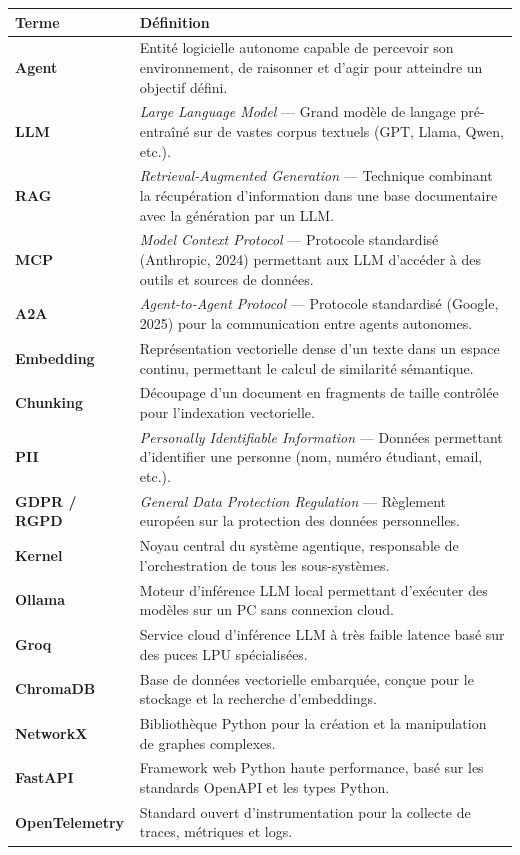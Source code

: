 \documentclass[12pt, a4paper]{article}
\begin{document}
\begin{longtable}{l p{11cm}}
\toprule
\textbf{Terme} & \textbf{Définition} \\
\midrule
\endhead
\textbf{Agent} & Entité logicielle autonome capable de percevoir son environnement, de raisonner et d'agir pour atteindre un objectif défini. \\
\addlinespace
\textbf{LLM} & \textit{Large Language Model} — Grand modèle de langage pré-entraîné sur de vastes corpus textuels (GPT, Llama, Qwen, etc.). \\
\addlinespace
\textbf{RAG} & \textit{Retrieval-Augmented Generation} — Technique combinant la récupération d'information dans une base documentaire avec la génération par un LLM. \\
\addlinespace
\textbf{MCP} & \textit{Model Context Protocol} — Protocole standardisé (Anthropic, 2024) permettant aux LLM d'accéder à des outils et sources de données. \\
\addlinespace
\textbf{A2A} & \textit{Agent-to-Agent Protocol} — Protocole standardisé (Google, 2025) pour la communication entre agents autonomes. \\
\addlinespace
\textbf{Embedding} & Représentation vectorielle dense d'un texte dans un espace continu, permettant le calcul de similarité sémantique. \\
\addlinespace
\textbf{Chunking} & Découpage d'un document en fragments de taille contrôlée pour l'indexation vectorielle. \\
\addlinespace
\textbf{PII} & \textit{Personally Identifiable Information} — Données permettant d'identifier une personne (nom, numéro étudiant, email, etc.). \\
\addlinespace
\textbf{GDPR / RGPD} & \textit{General Data Protection Regulation} — Règlement européen sur la protection des données personnelles. \\
\addlinespace
\textbf{Kernel} & Noyau central du système agentique, responsable de l'orchestration de tous les sous-systèmes. \\
\addlinespace
\textbf{Ollama} & Moteur d'inférence LLM local permettant d'exécuter des modèles sur un PC sans connexion cloud. \\
\addlinespace
\textbf{Groq} & Service cloud d'inférence LLM à très faible latence basé sur des puces LPU spécialisées. \\
\addlinespace
\textbf{ChromaDB} & Base de données vectorielle embarquée, conçue pour le stockage et la recherche d'embeddings. \\
\addlinespace
\textbf{NetworkX} & Bibliothèque Python pour la création et la manipulation de graphes complexes. \\
\addlinespace
\textbf{FastAPI} & Framework web Python haute performance, basé sur les standards OpenAPI et les types Python. \\
\addlinespace
\textbf{OpenTelemetry} & Standard ouvert d'instrumentation pour la collecte de traces, métriques et logs. \\
\bottomrule
\end{longtable}
\end{document}
